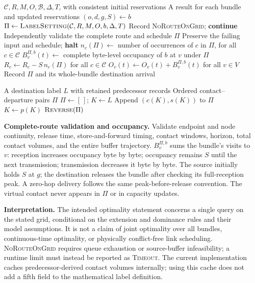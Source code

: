 \documentclass[10pt,a4paper]{article}
\newcommand{\nil}{\bot}
\begin{document}
\newpage
\begin{algorithm}[H]
\caption{Sequential Planning and Reservation}
\label{alg:sequential}
\begin{algorithmic}[1]
\Require $\mathcal C,R,M,O,\mathcal B,\Delta,T$, with consistent initial reservations
\Ensure A result for each bundle and updated reservations
 \State $(o,d,g,S)\gets b$
 \State $\Pi\gets\Call{LabelSetting}{\mathcal C,R,M,O,b,\Delta,T}$ 
  \State Record \textsc{NoRouteOnGrid}; \textbf{continue}
 \EndIf
 \State Independently validate the complete route and schedule $\Pi$
  \State Preserve the failing input and schedule; \textbf{halt}
 \EndIf
 \State $n_c(\Pi)\gets$ number of occurrences of $c$ in $\Pi$, for all $c\in\mathcal C$
 \State $B_v^{\Pi,b}(t)\gets$ complete byte-level occupancy of $b$ at $v$ under $\Pi$
 \State $R_c\gets R_c-S\,n_c(\Pi)$ for all $c\in\mathcal C$
 \State $O_v(t)\gets O_v(t)+B_v^{\Pi,b}(t)$ for all $v\in V$
 \State Record $\Pi$ and its whole-bundle destination arrival
\EndFor
\end{algorithmic}
\end{algorithm}

\begin{algorithm}[H]
\caption{Route and Departure-Time Reconstruction}
\label{alg:reconstruct}
\begin{algorithmic}[1]
\Require A destination label $L$ with retained predecessor records
\Ensure Ordered contact--departure pairs $\Pi$
\State $\Pi\gets[\,]$; $K\gets L$
\While{$p(K)\neq\nil$}
 \State Append $(c(K),s(K))$ to $\Pi$
 \State $K\gets p(K)$
\EndWhile
\State \Return $\Call{Reverse}{\Pi}$
\end{algorithmic}
\end{algorithm}

\noindent\textbf{Complete-route validation and occupancy.}
Validate endpoint and node continuity, release time, store-and-forward timing, contact windows, horizon, total contact volumes, and the entire buffer trajectory.
$B_v^{\Pi,b}$ sums the bundle's visits to $v$: reception increases occupancy byte by byte; occupancy remains $S$ until the next transmission; transmission decreases it byte by byte. The source initially holds $S$ at $g$; the destination releases the bundle after checking its full-reception peak. A zero-hop delivery follows the same peak-before-release convention.
The virtual contact never appears in $\Pi$ or in capacity updates.

\medskip
\noindent\textbf{Interpretation.}
The intended optimality statement concerns a single query on the stated grid, conditional on the extension and dominance rules and their model assumptions.
It is not a claim of joint optimality over all bundles, continuous-time optimality, or physically conflict-free link scheduling.
\textsc{NoRouteOnGrid} requires queue exhaustion or source-buffer infeasibility; a runtime limit must instead be reported as \textsc{Timeout}.
The current implementation caches predecessor-derived contact volumes internally; using this cache does not add a fifth field to the mathematical label definition.
\end{document}
